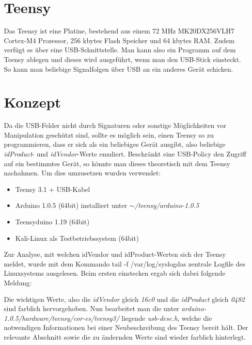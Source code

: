 \section{Teensy}
Das Teensy ist eine Platine, bestehend aus einem 72 MHz MK20DX256VLH7 Cortex-M4 Prozessor, 256 kbytes Flash Speicher und 64 kbytes RAM. Zudem verfügt es über eine USB-Schnittstelle. Man kann also ein Programm auf dem Teensy ablegen und dieses wird ausgeführt, wenn man den USB-Stick einsteckt. So kann man beliebige Signalfolgen über USB an ein anderes Gerät schicken.
			
\section{Konzept}
Da die USB-Felder nicht durch Signaturen oder sonstige Möglichkeiten vor Manipulation geschützt sind, sollte es möglich sein, einen Teensy so zu programmieren, dass er sich als ein beliebiges Gerät ausgibt, also beliebige \textit{idProduct}- und \textit{idVendor}-Werte emuliert. Beschränkt eine USB-Policy den Zugriff auf ein bestimmtes Gerät, so könnte man dieses theoretisch mit dem Teensy nachahmen.
Um dies umzusetzen wurden verwendet:

\begin{itemize}
	\item Teensy 3.1 + USB-Kabel
	\item Arduino 1.0.5 (64bit) installiert unter \textit{$\sim$/teensy/arduino-1.0.5}
	\item Teensyduino 1.19 (64bit)
	\item Kali-Linux als Testbetriebssystem (64bit)
\end{itemize}

Zur Analyse, mit welchen idVendor und idProduct-Werten sich der Teensy meldet, wurde mit dem Kommando \glqq tail -f /var/log/syslog\grqq das zentrale Logfile des Linuxsystems ausgelesen. Beim ersten einstecken ergab sich dabei folgende Meldung:

\lstset{language=log}


Die wichtigen Werte, also die \textit{idVendor} gleich \textit{16c0} und die \textit{idProduct} gleich \textit{0482} sind farblich hervorgehoben. Nun bearbeitet man die unter \textit{arduino-1.0.5/hardware/teensy/cor-es/teensy3/} liegende \textit{usb-desc.h}, welche die notwendigen Informationen bei einer Neubeschreibung des Teensy bereit hält. Der relevante Abschnitt sowie die zu ändernden Werte sind wieder farblich hinterlegt.

